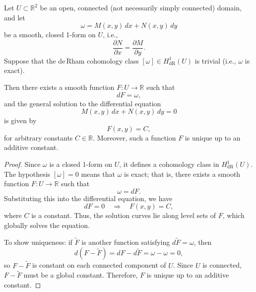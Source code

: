 \documentclass[10pt,a4paper]{amsart}
\begin{document}
\begin{theorem}
Let \( U \subset \mathbb{R}^2 \) be an open, connected (not necessarily simply connected) domain, and let
\[
\omega = M(x, y)\, dx + N(x, y)\, dy
\]
be a smooth, closed 1-form on \( U \), i.e.,
\[
\frac{\partial N}{\partial x} = \frac{\partial M}{\partial y}.
\]
Suppose that the de\,Rham cohomology class \( [\omega] \in H^1_{\mathrm{dR}}(U) \) is trivial (i.e., \( \omega \) is exact).

Then there exists a smooth function \( F : U \to \mathbb{R} \) such that
\[
dF = \omega,
\]
and the general solution to the differential equation
\[
M(x, y)\, dx + N(x, y)\, dy = 0
\]
is given by
\[
F(x, y) = C,
\]
for arbitrary constants \( C \in \mathbb{R} \). Moreover, such a function \( F \) is unique up to an additive constant.
\end{theorem}

\begin{proof}
Since \( \omega \) is a closed 1-form on \( U \), it defines a cohomology class in \( H^1_{\mathrm{dR}}(U) \). The hypothesis \( [\omega] = 0 \) means that \( \omega \) is exact; that is, there exists a smooth function \( F : U \to \mathbb{R} \) such that
\[
\omega = dF.
\]
Substituting this into the differential equation, we have
\[
dF = 0 \quad \Rightarrow \quad F(x, y) = C,
\]
where \( C \) is a constant. Thus, the solution curves lie along level sets of \( F \), which globally solves the equation.

To show uniqueness: if \( \tilde{F} \) is another function satisfying \( d\tilde{F} = \omega \), then
\[
d(F - \tilde{F}) = dF - d\tilde{F} = \omega - \omega = 0,
\]
so \( F - \tilde{F} \) is constant on each connected component of \( U \). Since \( U \) is connected, \( F - \tilde{F} \) must be a global constant. Therefore, \( F \) is unique up to an additive constant.
\end{proof}
\end{document}
